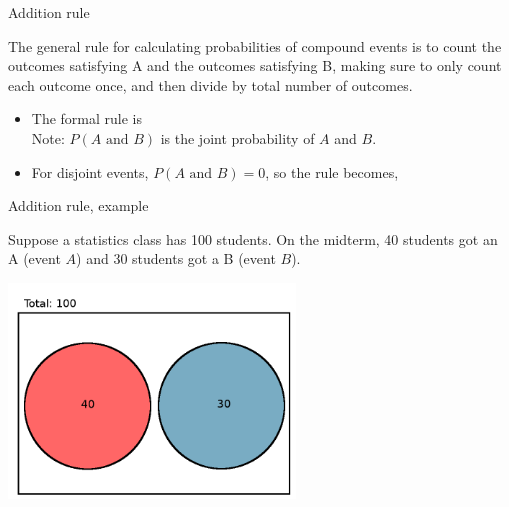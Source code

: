 \documentclass[xcolor=table, aspectratio=169, bigger]{beamer}
\begin{document}
\begin{frame}{Addition rule}
\begin{block}{}
The general rule for calculating probabilities of compound events is to count the outcomes satisfying A and the outcomes satisfying B, making sure to only count each outcome once, and then divide by total number of outcomes.
\end{block}

\pause
\begin{block}{}
\begin{itemize}
\item The formal rule is\\
\smallskip{}
\medskip Note: $P(A \text{ and } B)$ is the joint probability of $A$ and $B$.

\pause\medskip
\item For disjoint events, $P(A \text{ and } B) = 0$, so the rule becomes,\\
\smallskip{}
\end{itemize}
\end{block}
\end{frame}

\begin{frame}{Addition rule, example}
\begin{block}{}
Suppose a statistics class has 100 students. On the midterm, 40 students got an A (event $A$) and 30 students got a B (event $B$).
\end{block}

{\centering
\includegraphics[width=3in]{../images/ch4_venn_dsj_ex}\par
}
\end{frame}
\end{document}
